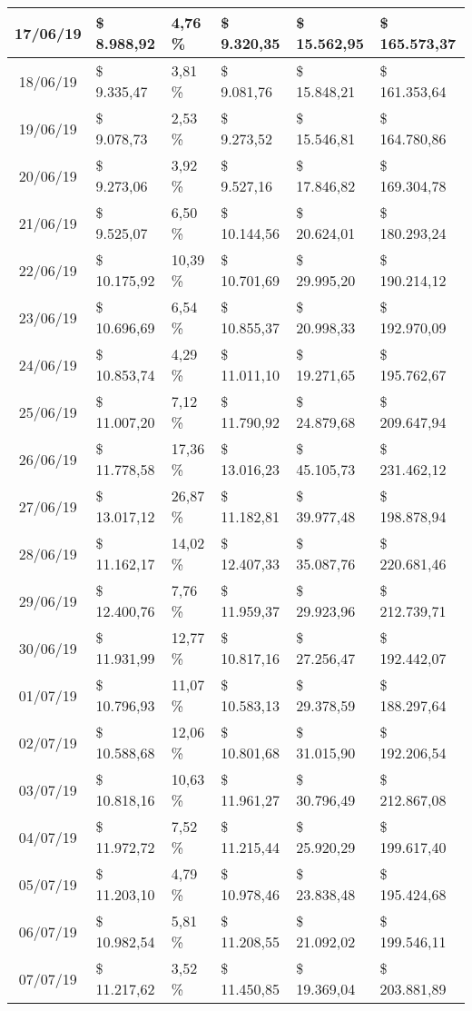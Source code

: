 \begin{small}
\begin{longtable}{|c|l|l|l|l|l|}
17/06/19 & \$ 8.988,92 & 4,76 \% & \$ 9.320,35 & \$ 15.562,95 & \$ 165.573,37 \\ \hline
18/06/19 & \$ 9.335,47 & 3,81 \% & \$ 9.081,76 & \$ 15.848,21 & \$ 161.353,64 \\ \hline
19/06/19 & \$ 9.078,73 & 2,53 \% & \$ 9.273,52 & \$ 15.546,81 & \$ 164.780,86 \\ \hline
20/06/19 & \$ 9.273,06 & 3,92 \% & \$ 9.527,16 & \$ 17.846,82 & \$ 169.304,78 \\ \hline
21/06/19 & \$ 9.525,07 & 6,50 \% & \$ 10.144,56 & \$ 20.624,01 & \$ 180.293,24 \\ \hline
22/06/19 & \$ 10.175,92 & 10,39 \% & \$ 10.701,69 & \$ 29.995,20 & \$ 190.214,12 \\ \hline
23/06/19 & \$ 10.696,69 & 6,54 \% & \$ 10.855,37 & \$ 20.998,33 & \$ 192.970,09 \\ \hline
24/06/19 & \$ 10.853,74 & 4,29 \% & \$ 11.011,10 & \$ 19.271,65 & \$ 195.762,67 \\ \hline
25/06/19 & \$ 11.007,20 & 7,12 \% & \$ 11.790,92 & \$ 24.879,68 & \$ 209.647,94 \\ \hline
26/06/19 & \$ 11.778,58 & 17,36 \% & \$ 13.016,23 & \$ 45.105,73 & \$ 231.462,12 \\ \hline
27/06/19 & \$ 13.017,12 & 26,87 \% & \$ 11.182,81 & \$ 39.977,48 & \$ 198.878,94 \\ \hline
28/06/19 & \$ 11.162,17 & 14,02 \% & \$ 12.407,33 & \$ 35.087,76 & \$ 220.681,46 \\ \hline
29/06/19 & \$ 12.400,76 & 7,76 \% & \$ 11.959,37 & \$ 29.923,96 & \$ 212.739,71 \\ \hline
30/06/19 & \$ 11.931,99 & 12,77 \% & \$ 10.817,16 & \$ 27.256,47 & \$ 192.442,07 \\ \hline
01/07/19 & \$ 10.796,93 & 11,07 \% & \$ 10.583,13 & \$ 29.378,59 & \$ 188.297,64 \\ \hline
02/07/19 & \$ 10.588,68 & 12,06 \% & \$ 10.801,68 & \$ 31.015,90 & \$ 192.206,54 \\ \hline
03/07/19 & \$ 10.818,16 & 10,63 \% & \$ 11.961,27 & \$ 30.796,49 & \$ 212.867,08 \\ \hline
04/07/19 & \$ 11.972,72 & 7,52 \% & \$ 11.215,44 & \$ 25.920,29 & \$ 199.617,40 \\ \hline
05/07/19 & \$ 11.203,10 & 4,79 \% & \$ 10.978,46 & \$ 23.838,48 & \$ 195.424,68 \\ \hline
06/07/19 & \$ 10.982,54 & 5,81 \% & \$ 11.208,55 & \$ 21.092,02 & \$ 199.546,11 \\ \hline
07/07/19 & \$ 11.217,62 & 3,52 \% & \$ 11.450,85 & \$ 19.369,04 & \$ 203.881,89 \\ \hline

\end{longtable}
\end{small}
